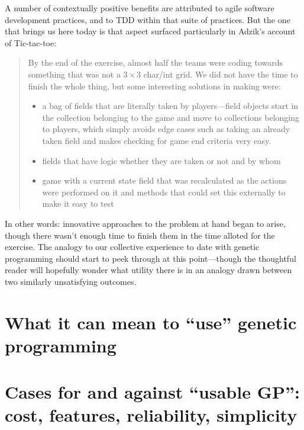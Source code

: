 A number of contextually positive benefits are attributed to agile software development practices, and to TDD within that suite of practices. But the one that brings us here today is that aspect surfaced particularly in Adzik's account of Tic-tac-toe:

\begin{quotation}
By the end of the exercise, almost half the teams were coding towards something that was not a $3\times 3$ char/int grid. We did not have the time to finish the whole thing, but some interesting solutions in making were:

\begin{itemize}
\item a bag of fields that are literally taken by players---field objects start in the collection belonging to the game and move to collections belonging to players, which simply avoids edge cases such as taking an already taken field and makes checking for game end criteria very easy.
\item fields that have logic whether they are taken or not and by whom
\item game with a current state field that was recalculated as the actions were performed on it and methods that could set this externally to make it easy to test
\end{itemize}
\end{quotation}

In other words: innovative approaches to the problem at hand began to arise, though there wasn't enough time to finish them in the time alloted for the exercise. The analogy to our collective experience to date with genetic programming should start to peek through at this point---though the thoughtful reader will hopefully wonder what utility there is in an analogy drawn between two similarly unsatisfying outcomes.

\section{What it can mean to ``use'' genetic programming}\hypertarget{what-it-can-mean-to-use-genetic-programming}{}\label{what-it-can-mean-to-use-genetic-programming}

\section{Cases for and against ``usable GP'': cost, features, reliability, simplicity}\hypertarget{cases-for-and-against-usable-gp-cost-features-reliability-simplicity}{}\label{cases-for-and-against-usable-gp-cost-features-reliability-simplicity}

